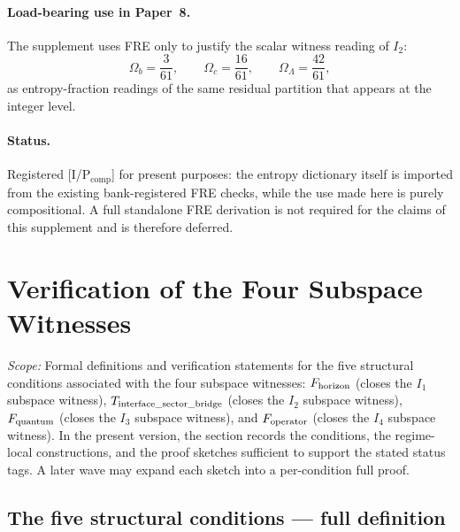 \documentclass[11pt]{article}
\theoremstyle{plain}
\theoremstyle{definition}
\theoremstyle{remark}
\begin{document}
\paragraph{Load-bearing use in Paper~8.}
The supplement uses FRE only to justify the scalar witness reading of $I_2$:
\[
\Omega_b=\frac{3}{61},\qquad
\Omega_c=\frac{16}{61},\qquad
\Omega_\Lambda=\frac{42}{61},
\]
as entropy-fraction readings of the same residual partition that appears at the integer level.

\paragraph{Status.}
Registered [I/P\(_{\mathrm{comp}}\)] for present purposes: the entropy dictionary itself is imported from the existing bank-registered FRE checks, while the use made here is purely compositional.  A full standalone FRE derivation is not required for the claims of this supplement and is therefore deferred.

\section{Verification of the Four Subspace Witnesses}\label{supp:E}

\noindent\textit{Scope:} Formal definitions and verification statements for the five structural conditions associated with the four subspace witnesses: $F_{\rm horizon}$ (closes the $I_1$ subspace witness), $T_{\rm interface\_sector\_bridge}$ (closes the $I_2$ subspace witness), $F_{\rm quantum}$ (closes the $I_3$ subspace witness), and $F_{\rm operator}$ (closes the $I_4$ subspace witness).  In the present version, the section records the conditions, the regime-local constructions, and the proof sketches sufficient to support the stated status tags.  A later wave may expand each sketch into a per-condition full proof.

\bigskip

\subsection{The five structural conditions --- full definition}\label{supp:E1}
\end{document}
